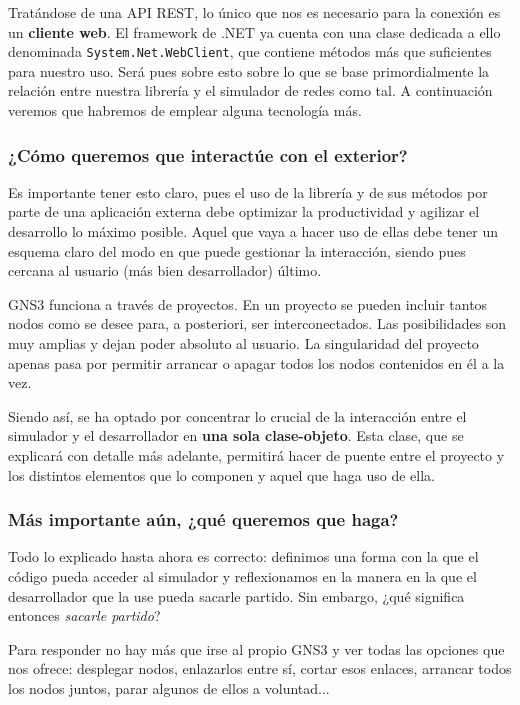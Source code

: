 Tratándose de una API REST, lo único que nos es necesario para la conexión es un \textbf{cliente web}. El framework de .NET ya cuenta con una clase dedicada a ello denominada \texttt{System.Net.WebClient}\cite{webclient}, que contiene métodos más que suficientes para nuestro uso. Será pues sobre esto sobre lo que se base primordialmente la relación entre nuestra librería y el simulador de redes como tal. A continuación veremos que habremos de emplear alguna tecnología más.

\subsubsection[Acceso a la API]{¿Cómo queremos que interactúe con el exterior?}\label{subsec:accesoapi}
Es importante tener esto claro, pues el uso de la librería y de sus métodos por parte de una aplicación externa debe optimizar la productividad y agilizar el desarrollo lo máximo posible. Aquel que vaya a hacer uso de ellas debe tener un esquema claro del modo en que puede gestionar la interacción, siendo pues cercana al usuario (más bien desarrollador) último.

GNS3 funciona a través de proyectos. En un proyecto se pueden incluir tantos nodos como se desee para, a posteriori, ser interconectados. Las posibilidades son muy amplias y dejan poder absoluto al usuario. La singularidad del proyecto apenas pasa por permitir arrancar o apagar todos los nodos contenidos en él a la vez.

Siendo así, se ha optado por concentrar lo crucial de la interacción entre el simulador y el desarrollador en \textbf{una sola clase-objeto}. Esta clase, que se explicará con detalle más adelante, permitirá hacer de puente entre el proyecto y los distintos elementos que lo componen y aquel que haga uso de ella.

\subsubsection[Funcionalidad]{Más importante aún, ¿qué queremos que haga?}
Todo lo explicado hasta ahora es correcto: definimos una forma con la que el código pueda acceder al simulador y reflexionamos en la manera en la que el desarrollador que la use pueda sacarle partido. Sin embargo, ¿qué significa entonces \textit{sacarle partido}?

Para responder no hay más que irse al propio GNS3 y ver todas las opciones que nos ofrece: desplegar nodos, enlazarlos entre sí, cortar esos enlaces, arrancar todos los nodos juntos, parar algunos de ellos a voluntad... 

